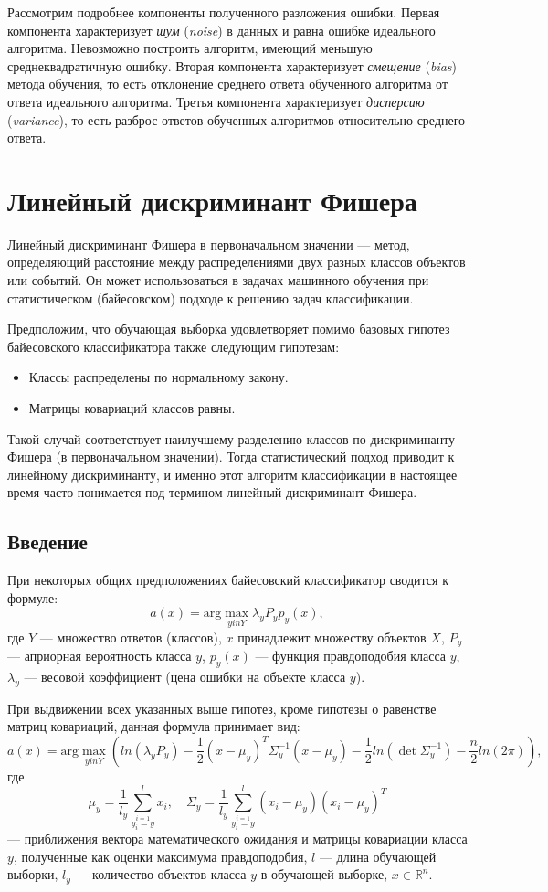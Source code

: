 Рассмотрим подробнее компоненты полученного разложения ошибки. Первая компонента характеризует \emph{шум} (\emph{noise}) в данных и равна ошибке идеального алгоритма. Невозможно построить алгоритм, имеющий меньшую среднеквадратичную ошибку. Вторая компонента характеризует \emph{смещение} (\emph{bias}) метода обучения, то есть отклонение среднего ответа обученного алгоритма от ответа идеального алгоритма. Третья компонента характеризует \emph{дисперсию} (\emph{variance}), то есть разброс ответов обученных алгоритмов относительно среднего ответа.

\section*{Линейный дискриминант Фишера}

Линейный дискриминант Фишера в первоначальном значении — метод, определяющий расстояние между распределениями двух разных классов объектов или событий. Он может использоваться в задачах машинного обучения при статистическом (байесовском) подходе к решению задач классификации.

Предположим, что обучающая выборка удовлетворяет помимо базовых гипотез байесовского классификатора также следующим гипотезам:
\begin{itemize}
    \item Классы распределены по нормальному закону.
    \item Матрицы ковариаций классов равны.
\end{itemize}

Такой случай соответствует наилучшему разделению классов по дискриминанту Фишера (в первоначальном значении). Тогда статистический подход приводит к линейному дискриминанту, и именно этот алгоритм классификации в настоящее время часто понимается под термином линейный дискриминант Фишера.

\subsection*{Введение}

При некоторых общих предположениях байесовский классификатор сводится к формуле:
\[
    a(x) = \mathrm{arg}\max_{yin Y} \lambda_{y} P_y p_y(x),
\]
где $Y$ — множество ответов (классов), $x$ принадлежит множеству объектов $X$, $P_y$ — априорная вероятность класса $y$, $p_y(x)$ — функция правдоподобия класса $y$, $\lambda_{y}$ — весовой коэффициент (цена ошибки на объекте класса $y$).

При выдвижении всех указанных выше гипотез, кроме гипотезы о равенстве матриц ковариаций, данная формула принимает вид:
\[
    a(x) = \mathrm{arg}\max_{yin Y} \left( ln(\lambda_{y} P_y) - \frac{1}{2}(x - \mu_y)^T \Sigma^{-1}_{y} (x - \mu_y) - \frac{1}{2}ln(\det{\Sigma^{-1}_{y}}) - \frac{n}{2}ln(2\pi) \right),
\]
где
\[
    \mu_y = \frac{1}{l_y} \sum^{l}_{\stackrel{i=1}{y_i = y}}x_i, \quad
    \Sigma_y = \frac{1}{l_y} \sum^{l}_{\stackrel{i=1}{y_i = y}}(x_i - \mu_y)(x_i - \mu_y)^T
\]
— приближения вектора математического ожидания и матрицы ковариации класса $y$, полученные как оценки максимума правдоподобия, $l$ — длина обучающей выборки, $l_y$ — количество объектов класса $y$ в обучающей выборке, $x \in \mathbb{R}^n$.

